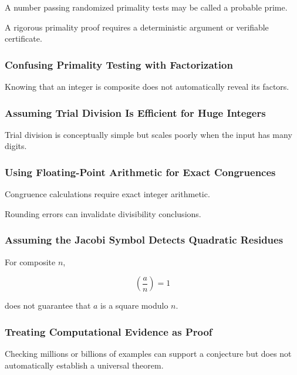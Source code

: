 A number passing randomized primality tests may be called a probable prime.

A rigorous primality proof requires a deterministic argument or verifiable
certificate.

\subsubsection{Confusing Primality Testing with Factorization}

Knowing that an integer is composite does not automatically reveal its
factors.

\subsubsection{Assuming Trial Division Is Efficient for Huge Integers}

Trial division is conceptually simple but scales poorly when the input has
many digits.

\subsubsection{Using Floating-Point Arithmetic for Exact Congruences}

Congruence calculations require exact integer arithmetic.

Rounding errors can invalidate divisibility conclusions.

\subsubsection{Assuming the Jacobi Symbol Detects Quadratic Residues}

For composite \(n\),

\[ \left(\frac an\right)=1 \]

does not guarantee that \(a\) is a square modulo \(n\).

\subsubsection{Treating Computational Evidence as Proof}

Checking millions or billions of examples can support a conjecture but does
not automatically establish a universal theorem.

